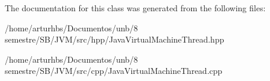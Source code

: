 The documentation for this class was generated from the following files\+:\begin{DoxyCompactItemize}
\item 
/home/arturhbs/\+Documentos/unb/8 semestre/\+S\+B/\+J\+V\+M/src/hpp/Java\+Virtual\+Machine\+Thread.\+hpp\item 
/home/arturhbs/\+Documentos/unb/8 semestre/\+S\+B/\+J\+V\+M/src/cpp/Java\+Virtual\+Machine\+Thread.\+cpp\end{DoxyCompactItemize}
